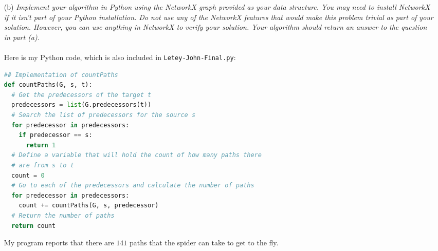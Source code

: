\documentclass[12pt]{article}
\begin{document}
{\begin{enumerate}
\item[(b)]\textsl{Implement your algorithm in Python using the NetworkX graph provided as your data structure. You may need to install NetworkX if it isn’t part of your Python installation. Do not use any of the NetworkX features that would make this problem trivial as part of your solution. However, you can use anything in NetworkX to verify your solution. Your algorithm should return an answer to the question in part (a).}\\ \\
Here is my Python code, which is also included in \texttt{Letey-John-Final.py}:
\begin{lstlisting}[language=Python]
## Implementation of countPaths
def countPaths(G, s, t):
  # Get the predecessors of the target t
  predecessors = list(G.predecessors(t))
  # Search the list of predecessors for the source s
  for predecessor in predecessors:
    if predecessor == s:
      return 1
  # Define a variable that will hold the count of how many paths there
  # are from s to t
  count = 0
  # Go to each of the predecessors and calculate the number of paths
  for predecessor in predecessors:
    count += countPaths(G, s, predecessor)
  # Return the number of paths
  return count
\end{lstlisting}
My program reports that there are $\boxed{141}$ paths that the spider can take to get to the fly.
\end{enumerate}

}
\end{document}
